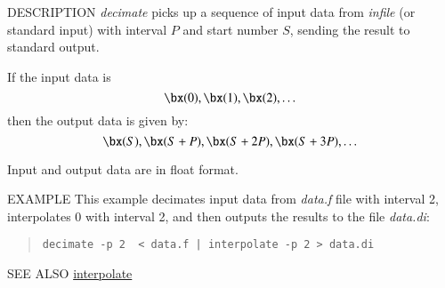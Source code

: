 \begin{synopsis}
\item[decimate] [ --p $P$ ] [ --s $S$ ] [ --l $L$ ] [ {\em infile} ]
\end{synopsis}

\begin{qsection}{DESCRIPTION}
{\em decimate} picks up a sequence of input data
from {\em infile} (or standard input)
with interval $P$ and start number $S$,
sending the result to standard output.

If the input data is
\begin{displaymath}
 \bx(0), \bx(1), \bx(2), \dots
\end{displaymath}
then the output data is given by:
\begin{displaymath}
 \bx(S), \bx(S+P), \bx(S+2P), \bx(S+3P),\dots
\end{displaymath}
\par
Input and output data are in float format.
\end{qsection}

\begin{options}
\end{options}

\begin{qsection}{EXAMPLE}
This example decimates input data from {\em data.f} file with interval 2,
interpolates 0 with interval 2, and then outputs the results to
the file {\em data.di}:
\begin{quote}
  \verb!decimate -p 2  < data.f | interpolate -p 2 > data.di!
\end{quote}
\end{qsection}

\begin{qsection}{SEE ALSO}
\hyperlink{interpolate}{interpolate}
\end{qsection}
